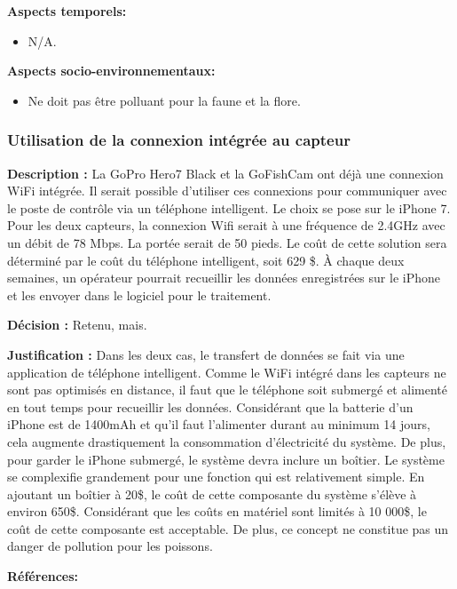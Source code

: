  \textbf{Aspects temporels:}
 \begin{itemize} [label = {--}]
    \item N/A.
\end{itemize}

 \textbf{Aspects socio-environnementaux:}
 \begin{itemize} [label = {--}]
    \item Ne doit pas être polluant pour la faune et la flore.
\end{itemize}

\subsubsection{Utilisation de la connexion intégrée au capteur}
\textbf{Description :} La GoPro Hero7 Black et la GoFishCam ont déjà une connexion WiFi intégrée. Il serait possible d'utiliser ces connexions pour communiquer avec le poste de contrôle via un téléphone intelligent. Le choix se pose sur le iPhone 7. Pour les deux capteurs, la connexion Wifi serait à une fréquence de 2.4GHz avec un débit de 78 Mbps. La portée serait de 50 pieds. Le coût de cette solution sera déterminé par le coût du téléphone intelligent, soit 629 \$. À chaque deux semaines, un opérateur pourrait recueillir les données enregistrées sur le iPhone et les envoyer dans le logiciel pour le traitement.

\textbf{Décision :} Retenu, mais.
 
\textbf{Justification :} Dans les deux cas, le transfert de données se fait via une application de téléphone intelligent. Comme le WiFi intégré dans les capteurs ne sont pas optimisés en distance, il faut que le téléphone soit submergé et alimenté en tout temps pour recueillir les données. Considérant que la batterie d'un iPhone est de 1400mAh et qu'il faut l'alimenter durant au minimum 14 jours, cela augmente drastiquement la consommation d'électricité du système. De plus, pour garder le iPhone submergé, le système devra inclure un boîtier. Le système se complexifie grandement pour une fonction qui est relativement simple. En ajoutant un boîtier à 20\$, le coût de cette composante du système s'élève à environ 650\$. Considérant que les coûts en matériel sont limités à 10 000\$, le coût de cette composante est acceptable. De plus, ce concept ne constitue pas un danger de pollution pour les poissons.

\textbf{Références:} \cite{GoPro_Specs} \cite{GoPro_Waterproof} \cite{GoFishCam} \cite{iPhone7}

